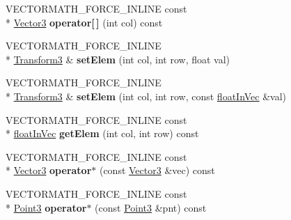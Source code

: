 \begin{DoxyCompactItemize}
\item 
\hypertarget{class_vectormath_1_1_aos_1_1_transform3_a571da0cb45db7fd0f5bbe99565cd7bdc}{V\+E\+C\+T\+O\+R\+M\+A\+T\+H\+\_\+\+F\+O\+R\+C\+E\+\_\+\+I\+N\+L\+I\+N\+E const \\*
\hyperlink{class_vectormath_1_1_aos_1_1_vector3}{Vector3} {\bfseries operator\mbox{[}$\,$\mbox{]}} (int col) const }\label{class_vectormath_1_1_aos_1_1_transform3_a571da0cb45db7fd0f5bbe99565cd7bdc}

\item 
\hypertarget{class_vectormath_1_1_aos_1_1_transform3_a08b89968cf498dd0363601185ca80505}{V\+E\+C\+T\+O\+R\+M\+A\+T\+H\+\_\+\+F\+O\+R\+C\+E\+\_\+\+I\+N\+L\+I\+N\+E \\*
\hyperlink{class_vectormath_1_1_aos_1_1_transform3}{Transform3} \& {\bfseries set\+Elem} (int col, int row, float val)}\label{class_vectormath_1_1_aos_1_1_transform3_a08b89968cf498dd0363601185ca80505}

\item 
\hypertarget{class_vectormath_1_1_aos_1_1_transform3_ae781be4b2392bb875232bc5dfa5bb5c6}{V\+E\+C\+T\+O\+R\+M\+A\+T\+H\+\_\+\+F\+O\+R\+C\+E\+\_\+\+I\+N\+L\+I\+N\+E \\*
\hyperlink{class_vectormath_1_1_aos_1_1_transform3}{Transform3} \& {\bfseries set\+Elem} (int col, int row, const \hyperlink{class_vectormath_1_1float_in_vec}{float\+In\+Vec} \&val)}\label{class_vectormath_1_1_aos_1_1_transform3_ae781be4b2392bb875232bc5dfa5bb5c6}

\item 
\hypertarget{class_vectormath_1_1_aos_1_1_transform3_aad3c8578cef83e688380d08a0ae6d5a2}{V\+E\+C\+T\+O\+R\+M\+A\+T\+H\+\_\+\+F\+O\+R\+C\+E\+\_\+\+I\+N\+L\+I\+N\+E const \\*
\hyperlink{class_vectormath_1_1float_in_vec}{float\+In\+Vec} {\bfseries get\+Elem} (int col, int row) const }\label{class_vectormath_1_1_aos_1_1_transform3_aad3c8578cef83e688380d08a0ae6d5a2}

\item 
\hypertarget{class_vectormath_1_1_aos_1_1_transform3_a678552b2611daded9628d31cf03bcf09}{V\+E\+C\+T\+O\+R\+M\+A\+T\+H\+\_\+\+F\+O\+R\+C\+E\+\_\+\+I\+N\+L\+I\+N\+E const \\*
\hyperlink{class_vectormath_1_1_aos_1_1_vector3}{Vector3} {\bfseries operator$\ast$} (const \hyperlink{class_vectormath_1_1_aos_1_1_vector3}{Vector3} \&vec) const }\label{class_vectormath_1_1_aos_1_1_transform3_a678552b2611daded9628d31cf03bcf09}

\item 
\hypertarget{class_vectormath_1_1_aos_1_1_transform3_a8850e6685195e7d7fc02939b9aaa71c1}{V\+E\+C\+T\+O\+R\+M\+A\+T\+H\+\_\+\+F\+O\+R\+C\+E\+\_\+\+I\+N\+L\+I\+N\+E const \\*
\hyperlink{class_vectormath_1_1_aos_1_1_point3}{Point3} {\bfseries operator$\ast$} (const \hyperlink{class_vectormath_1_1_aos_1_1_point3}{Point3} \&pnt) const }\label{class_vectormath_1_1_aos_1_1_transform3_a8850e6685195e7d7fc02939b9aaa71c1}


\end{DoxyCompactItemize}
